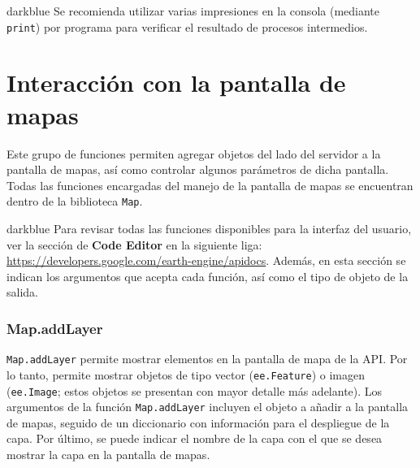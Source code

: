 \documentclass[
  12pt,
  letterpaper,
  twoside]{book}
\begin{document}
\begin{bluebox2}

\begin{awesomeblock}{5pt}{\faLightbulb}{darkblue}
Se recomienda utilizar varias impresiones en la consola (mediante \texttt{print}) por programa para verificar el resultado de procesos intermedios.

\end{awesomeblock}

\end{bluebox2}

\hypertarget{interacciuxf3n-con-la-pantalla-de-mapas}{%
\section{Interacción con la pantalla de mapas}\label{interacciuxf3n-con-la-pantalla-de-mapas}}

Este grupo de funciones permiten agregar objetos del lado del servidor a la pantalla de mapas, así como controlar algunos parámetros de dicha pantalla. Todas las funciones encargadas del manejo de la pantalla de mapas se encuentran dentro de la biblioteca \texttt{Map}.

\begin{bluebox2}

\begin{awesomeblock}{5pt}{\faLightbulb}{darkblue}
Para revisar todas las funciones disponibles para la interfaz del usuario, ver la sección de \textbf{Code Editor} en la siguiente liga: \url{https://developers.google.com/earth-engine/apidocs}. Además, en esta sección se indican los argumentos que acepta cada función, así como el tipo de objeto de la salida.

\end{awesomeblock}

\end{bluebox2}

\hypertarget{map.addlayer}{%
\subsubsection*{Map.addLayer}\label{map.addlayer}}

\texttt{Map.addLayer} permite mostrar elementos en la pantalla de mapa de la API. Por lo tanto, permite mostrar objetos de tipo vector (\texttt{ee.Feature}) o imagen (\texttt{ee.Image}; estos objetos se presentan con mayor detalle más adelante). Los argumentos de la función \texttt{Map.addLayer} incluyen el objeto a añadir a la pantalla de mapas, seguido de un diccionario con información para el despliegue de la capa. Por último, se puede indicar el nombre de la capa con el que se desea mostrar la capa en la pantalla de mapas.
\end{document}
